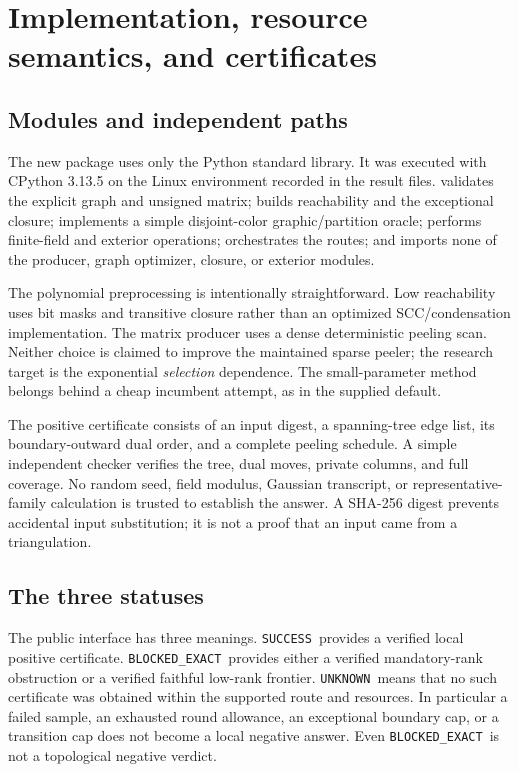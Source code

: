 \documentclass[11pt,letterpaper]{article}
\theoremstyle{definition}
\newcommand{\Yes}{\texttt{SUCCESS}}
\newcommand{\No}{\texttt{BLOCKED\_EXACT}}
\newcommand{\Unk}{\texttt{UNKNOWN}}
\begin{document}
\section{Implementation, resource semantics, and certificates}\label{sec:implementation}
\subsection{Modules and independent paths}
The new package uses only the Python standard library. It was executed with
CPython 3.13.5 on the Linux environment recorded in the result files.
 validates the explicit graph and unsigned matrix;
 builds reachability and the exceptional closure;
 implements a simple disjoint-color graphic/partition
oracle;  performs finite-field and exterior operations;
 orchestrates the routes; and  imports none
of the producer, graph optimizer, closure, or exterior modules.

The polynomial preprocessing is intentionally straightforward. Low
reachability uses bit masks and transitive closure rather than an optimized
SCC/condensation implementation. The matrix producer uses a dense deterministic
peeling scan. Neither choice is claimed to improve the maintained sparse
peeler; the research target is the exponential \emph{selection} dependence.
The small-parameter method belongs behind a cheap incumbent attempt, as in
the supplied default.

The positive certificate consists of an input digest, a spanning-tree edge
list, its boundary-outward dual order, and a complete peeling schedule. A
simple independent checker verifies the tree, dual moves, private columns,
and full coverage. No random seed, field modulus, Gaussian transcript, or
representative-family calculation is trusted to establish the answer.
A SHA-256 digest prevents accidental input substitution; it is not a proof
that an input came from a triangulation.

\subsection{The three statuses}
The public interface has three meanings. \Yes\ provides a verified local
positive certificate. \No\ provides either a verified mandatory-rank
obstruction or a verified faithful low-rank frontier. \Unk\ means that no
such certificate was obtained within the supported route and resources.
In particular a failed sample, an exhausted round allowance, an exceptional
boundary cap, or a transition cap does not become a local negative answer.
Even \No\ is not a topological negative verdict.
\end{document}
